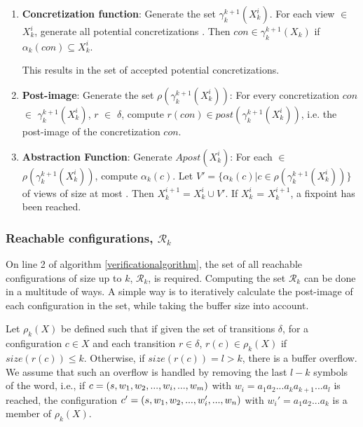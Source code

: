 \begin{enumerate}
\item
\textbf{Concretization function}:
Generate the set $\gamma_k^{k+1}(X_k^i)$. For each view  $\in$ $X_k^i$, generate all potential concretizations . Then $con \in \gamma_k^{k+1}(X_k)$ if $\alpha_k(con) \subseteq X_k^i$.

This results in the set of accepted potential concretizations.

\item
\textbf{Post-image}:
Generate the set $\rho(\gamma_k^{k+1}(X_k^i))$: For every concretization $con$ $\in$ $\gamma_k^{k+1}(X_k^i)$, $r$ $\in$ $\delta$, compute $r(con) \in post(\gamma_k^{k+1}(X_k^i))$, i.e. the post-image of the concretization $con$.

\item
\textbf{Abstraction Function}:
Generate $Apost(X_k^i)$: For each  $\in$ $\rho(\gamma_k^{k+1}(X_k^i))$, compute $\alpha_k(c)$. Let $V' = \{\alpha_k(c)|c \in \rho(\gamma_k^{k+1}(X_k^i))\}$ of views of size at most . Then $X_k^{i+1} = X_k^i \cup V'$. If $X_k^i$ = $X_k^{i+1}$, a fixpoint has been reached.

\end{enumerate}

\subsubsection{Reachable configurations, $\mathcal{R}_k$}
\label{part2}
On line 2 of algorithm \ref{verificationalgorithm}, the set of all reachable configurations of size up to $k$, $\mathcal{R}_k$, is required. Computing the set $\mathcal{R}_k$ can be done in a multitude of ways. A simple way is to iteratively calculate the post-image of each configuration in the set, while taking the buffer size into account.

Let $\rho_k(X)$ be defined such that if given the set of transitions $\delta$, for a configuration $c \in X$ and each transition $r \in \delta$, $r(c) \in \rho_k(X)$ if $size(r(c)) \leq k$. Otherwise, if $size(r(c)) = l > k$, there is a buffer overflow. We assume that such an overflow is handled by removing the last $l-k$ symbols of the word, i.e., if $c = (s, w_1, w_2,..., w_i, ...,  w_m)$ with $w_i = a_1a_2...a_ka_{k+1}...a_l$ is reached, the configuration $c' = (s, w_1, w_2, ..., w_i', ..., w_n)$ with $w_i' = a_1a_2...a_k$ is a member of $\rho_k(X)$.

